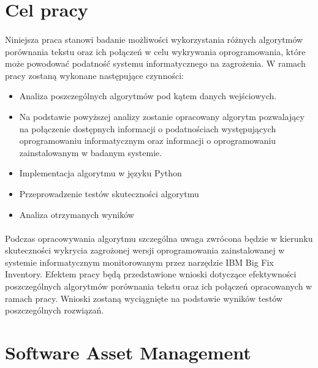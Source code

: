 \documentclass[a4paper,12pt,twoside]{article}
\begin{document}
\paragraph{}



\newpage
\section*{Cel pracy}
\paragraph{}
Niniejsza praca stanowi badanie możliwości wykorzystania różnych algorytmów porównania tekstu oraz ich połączeń w celu wykrywania oprogramowania, które może powodować podatność systemu informatycznego na zagrożenia. W ramach pracy zostaną wykonane następujące czynności:
\begin{itemize}
\item Analiza poszczególnych algorytmów pod kątem danych wejściowych. 
\item Na podstawie powyższej analizy zostanie opracowany algorytm pozwalający na połączenie dostępnych informacji o podatnościach występujących oprogramowaniu informatycznym oraz informacji o oprogramowaniu zainstalowanym w badanym systemie.
\item Implementacja algorytmu w języku Python
\item Przeprowadzenie testów skuteczności algorytmu
\item Analiza otrzymanych wyników
\end{itemize}
\paragraph{}
Podczas opracowywania algorytmu szczególna uwaga zwrócona będzie w kierunku skuteczności wykrycia zagrożonej wersji oprogramowania zainstalowanej w systemie informatycznym monitorowanym przez narzędzie IBM Big Fix Inventory. Efektem pracy będą przedstawione wnioski dotyczące efektywności poszczególnych algorytmów porównania tekstu oraz ich połączeń opracowanych w ramach pracy. Wnioski zostaną wyciągnięte na podstawie wyników testów poszczególnych rozwiązań.
\newpage
\thispagestyle{empty}
\mbox{}

\newpage
\section{Software Asset Management}
\end{document}
